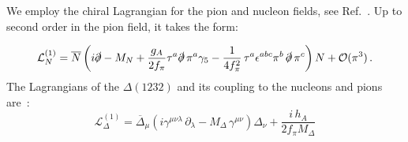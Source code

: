 \documentclass[twocolumn,prc,showpacs,nofootinbib,preprintnumbers,amsmath,amssymb,superscriptaddress]{revtex4-1}
\begin{document}
We employ the chiral Lagrangian for the pion and nucleon fields, see Ref.~\cite{GSS89}. Up to second order in the pion field, it takes the form:
\begin{widetext}
\begin{align}
\mathcal{L}^{(1)}_{N}  =  \overline{N}\left( i \slashed{\partial} -{M}_{N}
+ \frac{g_A}{2f_\pi} \tau^a \slashed{\partial}\,\pi^a\gamma_5 - \frac{1}{4f_\pi^2} \, \tau^a \epsilon^{abc}  \pi^b\,\slashed{\partial} \,\pi^c
\right) N  + \mathcal{O}(\pi^3) \,.
\label{expNlagran}
\end{align}
% 
% 
The Lagrangians of the $\Delta(1232)$ and its coupling to the nucleons and pions are~\cite{Pascalutsa:2002pi,Lensky:2009uv}:
\begin{equation}
\mathcal{L}^{(1)}_{\Delta} = \overline\Delta_\mu \left(i\gamma^{\mu\nu\lambda}\,\partial_\lambda - 
M_\Delta\,\gamma^{\mu\nu}\right) \Delta_\nu +  \frac{i\,h_A}{2f_\pi M_\Delta}

\end{equation}
\end{widetext}
\end{document}

